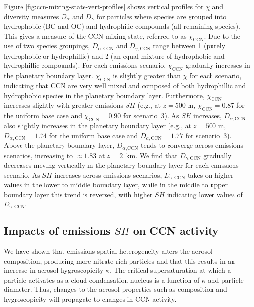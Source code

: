 Figure \ref{fig:ccn-mixing-state-vert-profiles} shows vertical profiles for $\chi$ and diversity measures $D_{\alpha}$ and $D_{\gamma}$ for particles where species are grouped into hydrophobic (BC and OC) and hydrophilic compounds (all remaining species). This gives a measure of the CCN mixing state, referred to as $\chi_{\text{CCN}}$. Due to the use of two species groupings, $D_{\alpha,\text{CCN}}$ and $D_{\gamma,\text{CCN}}$ range between 1 (purely hydrophobic or hydrophillic) and 2 (an equal mixture of hydrophobic and hydrophillic compounds). For each emissions scenario, $\chi_{\text{CCN}}$ gradually increases in the planetary boundary layer. $\chi_{\text{CCN}}$ is slightly greater than $\chi$ for each scenario, indicating that CCN are very well mixed and composed of both hydrophillic and hydrophobic species in the planetary boundary layer. Furthermore, $\chi_{\text{CCN}}$ increases slightly with greater emissions $SH$ (e.g., at $z=500$ m, $\chi_{\text{CCN}} = 0.87$ for the uniform base case and $\chi_{\text{CCN}} = 0.90$ for scenario~3). As $SH$ increases, $D_{\alpha,\text{CCN}}$ also slightly increases in the planetary boundary layer (e.g., at $z=500$ m, $D_{\alpha,\text{CCN}} = 1.74$ for the uniform base case and $D_{\alpha,\text{CCN}} = 1.77$ for scenario~3). Above the planetary boundary layer, $D_{\alpha,\text{CCN}}$ tends to converge across emissions scenarios, increasing to $\approx1.83$ at $z=2$~km. We find that $D_{\gamma,\text{CCN}}$ gradually decreases moving vertically in the planetary boundary layer for each emissions scenario. As $SH$ increases across emissions scenarios, $D_{\gamma,\text{CCN}}$ takes on higher values in the lower to middle boundary layer, while in the middle to upper boundary layer this trend is reversed, with higher $SH$ indicating lower values of $D_{\gamma,\text{CCN}}$. 

\subsection{Impacts of emissions $SH$ on CCN activity}

We have shown that emissions spatial heterogeneity alters the aerosol composition, producing more nitrate-rich particles and that this results in an increase in aerosol hygroscopicity $\kappa$. The critical supersaturation at which a particle activates as a cloud condensation nucleus is a function of $\kappa$ and particle diameter. Thus, changes to the aerosol properties such as composition and hygroscopicity will propagate to changes in CCN activity. 

